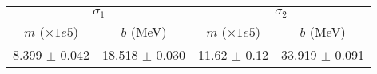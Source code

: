 \begin{tabular}{cc|cc}
\multicolumn{2}{c|}{$\sigma_1$} & \multicolumn{2}{|c}{$\sigma_2$} \\
$m$ ($\times1e5$) & $b$ (MeV) & $m$ ($\times1e5$) & $b$ (MeV) \\
\hline
8.399 $\pm$ 0.042 & 18.518 $\pm$ 0.030 & 11.62 $\pm$ 0.12 & 33.919 $\pm$ 0.091\\
\end{tabular}
